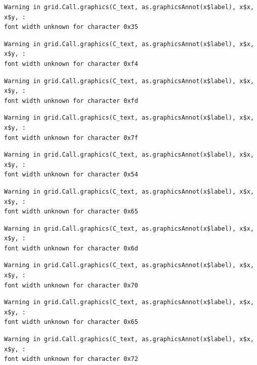 \documentclass[
  letterpaper,
  DIV=11,
  numbers=noendperiod]{scrreprt}
\begin{document}
\begin{verbatim}
Warning in grid.Call.graphics(C_text, as.graphicsAnnot(x$label), x$x, x$y, :
font width unknown for character 0x35
\end{verbatim}

\begin{verbatim}
Warning in grid.Call.graphics(C_text, as.graphicsAnnot(x$label), x$x, x$y, :
font width unknown for character 0xf4
\end{verbatim}

\begin{verbatim}
Warning in grid.Call.graphics(C_text, as.graphicsAnnot(x$label), x$x, x$y, :
font width unknown for character 0xfd
\end{verbatim}

\begin{verbatim}
Warning in grid.Call.graphics(C_text, as.graphicsAnnot(x$label), x$x, x$y, :
font width unknown for character 0x7f
\end{verbatim}

\begin{verbatim}
Warning in grid.Call.graphics(C_text, as.graphicsAnnot(x$label), x$x, x$y, :
font width unknown for character 0x54
\end{verbatim}

\begin{verbatim}
Warning in grid.Call.graphics(C_text, as.graphicsAnnot(x$label), x$x, x$y, :
font width unknown for character 0x65
\end{verbatim}

\begin{verbatim}
Warning in grid.Call.graphics(C_text, as.graphicsAnnot(x$label), x$x, x$y, :
font width unknown for character 0x6d
\end{verbatim}

\begin{verbatim}
Warning in grid.Call.graphics(C_text, as.graphicsAnnot(x$label), x$x, x$y, :
font width unknown for character 0x70
\end{verbatim}

\begin{verbatim}
Warning in grid.Call.graphics(C_text, as.graphicsAnnot(x$label), x$x, x$y, :
font width unknown for character 0x65
\end{verbatim}

\begin{verbatim}
Warning in grid.Call.graphics(C_text, as.graphicsAnnot(x$label), x$x, x$y, :
font width unknown for character 0x72
\end{verbatim}
\end{document}
